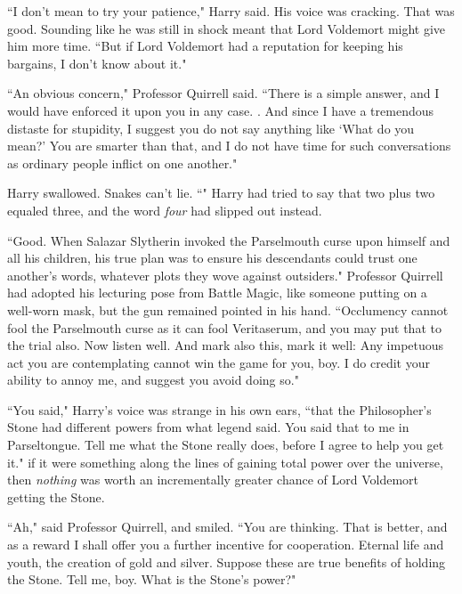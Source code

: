 ``I don't mean to try your patience," Harry said. His voice was cracking. That was good. Sounding like he was still in shock meant that Lord Voldemort might give him more time. ``But if Lord Voldemort had a reputation for keeping his bargains, I don't know about it."

``An obvious concern," Professor Quirrell said. ``There is a simple answer, and I would have enforced it upon you in any case. . And since I have a tremendous distaste for stupidity, I suggest you do not say anything like `What do you mean?' You are smarter than that, and I do not have time for such conversations as ordinary people inflict on one another."

Harry swallowed. Snakes can't lie. ``" Harry had tried to say that two plus two equaled three, and the word \emph{four} had slipped out instead.

``Good. When Salazar Slytherin invoked the Parselmouth curse upon himself and all his children, his true plan was to ensure his descendants could trust one another's words, whatever plots they wove against outsiders." Professor Quirrell had adopted his lecturing pose from Battle Magic, like someone putting on a well-worn mask, but the gun remained pointed in his hand. ``Occlumency cannot fool the Parselmouth curse as it can fool Veritaserum, and you may put that to the trial also. Now listen well.  And mark also this, mark it well:  Any impetuous act you are contemplating cannot win the game for you, boy. I do credit your ability to annoy me, and suggest you avoid doing so."

``You said," Harry's voice was strange in his own ears, ``that the Philosopher's Stone had different powers from what legend said. You said that to me in Parseltongue. Tell me what the Stone really does, before I agree to help you get it." if it were something along the lines of gaining total power over the universe, then \emph{nothing} was worth an incrementally greater chance of Lord Voldemort getting the Stone.

``Ah," said Professor Quirrell, and smiled. ``You are thinking. That is better, and as a reward I shall offer you a further incentive for cooperation. Eternal life and youth, the creation of gold and silver. Suppose these are true benefits of holding the Stone. Tell me, boy. What is the Stone's power?"

